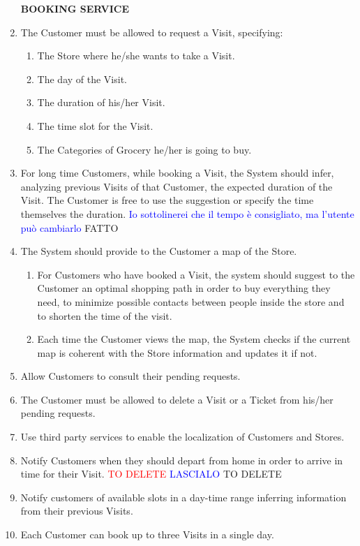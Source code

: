 \documentclass[a4paper, 10pt, oneside]{article}
\newcommand*{\lorenzo}[1]{\textcolor{BurntOrange}{#1}}
\newcommand{\yasmin}[1]{\textcolor{Red}{#1}}
\newcommand{\giovanni}[1]{\textcolor{Blue}{#1}}
\begin{document}
\begin{enumerate}[align=left, label={R.\arabic{*}}]
    \item[\textbf{BOOKING SERVICE}]
    \item \label{req:requestVisit}The Customer must be allowed to request a Visit, specifying:
    \begin{enumerate}[label={-}]
        \item \label{req:requestVisit:location}The Store where he/she wants to take a Visit.
        \item \label{req:requestVisit:date}The day of the Visit.
        \item \label{req:requestVisit:duration}The duration of his/her Visit.
        \item \label{req:requestVisit:timeslot}The time slot for the Visit.
        \item \label{req:requestVisit:categoriesToBuy}The Categories of Grocery he/her is going to buy.
    \end{enumerate}
    \item \label{req:statisticForDuration}For long time Customers, while booking a Visit, the System should infer, analyzing previous Visits of that Customer, the expected duration of the Visit. The Customer is free to use the suggestion or specify the time themselves the duration. \giovanni{Io sottolinerei che il tempo è consigliato, ma l'utente può cambiarlo} \lorenzo{FATTO}
    \item \label{req:sysProvideMap}The System should provide to the Customer a map of the Store.
    \begin{enumerate}[label={-}]
        \item \label{req:sysProvideMap:suggestPath}For Customers who have booked a Visit, the system should suggest to the Customer an optimal shopping path in order to buy everything they need, to minimize possible contacts between people inside the store and to shorten the time of the visit.
        \item \label{req:sysProvideMap:update} Each time the Customer views the map, the System checks if the current map is coherent with the Store information and updates it if not.
    \end{enumerate}
    \item \label{req:seeRequests}Allow Customers to consult their pending requests.
    \item \label{req:deleteTickOrVis}The Customer must be allowed to delete a Visit or a Ticket from his/her pending requests.
    \item \label{req:thirdPartyGPS}Use third party services to enable the localization of Customers and Stores. 
    \item \lorenzo{Notify Customers when they should depart from home in order to arrive in time for their Visit.} \yasmin{TO DELETE} \giovanni{LASCIALO} \lorenzo{TO DELETE} %
    \item \label{req:notifyCustomerOpenSlots}Notify customers of available slots in a day-time range inferring information from their previous Visits.
    \item \label{req:visitPerDay} Each Customer can book up to three Visits in a single day.
    

\end{enumerate}
\end{document}
